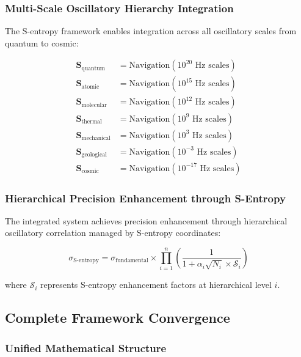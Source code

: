 \documentclass[12pt,a4paper]{article}
\begin{document}
{\subsubsection{Multi-Scale Oscillatory Hierarchy Integration}

The S-entropy framework enables integration across all oscillatory scales from quantum to cosmic:

\begin{align}
\mathbf{S}_{\text{quantum}} &= \text{Navigation}(10^{20} \text{ Hz scales}) \\
\mathbf{S}_{\text{atomic}} &= \text{Navigation}(10^{15} \text{ Hz scales}) \\
\mathbf{S}_{\text{molecular}} &= \text{Navigation}(10^{12} \text{ Hz scales}) \\
\mathbf{S}_{\text{thermal}} &= \text{Navigation}(10^{9} \text{ Hz scales}) \\
\mathbf{S}_{\text{mechanical}} &= \text{Navigation}(10^{3} \text{ Hz scales}) \\
\mathbf{S}_{\text{geological}} &= \text{Navigation}(10^{-3} \text{ Hz scales}) \\
\mathbf{S}_{\text{cosmic}} &= \text{Navigation}(10^{-17} \text{ Hz scales})
\end{align}

\subsubsection{Hierarchical Precision Enhancement through S-Entropy}

The integrated system achieves precision enhancement through hierarchical oscillatory correlation managed by S-entropy coordinates:

$$\sigma_{\text{S-entropy}} = \sigma_{\text{fundamental}} \times \prod_{i=1}^{n}\left(\frac{1}{1 + \alpha_i\sqrt{N_i} \times \mathcal{S}_i}\right)$$

where $\mathcal{S}_i$ represents S-entropy enhancement factors at hierarchical level $i$.

\subsection{Complete Framework Convergence}

\subsubsection{Unified Mathematical Structure}

}
\end{document}
